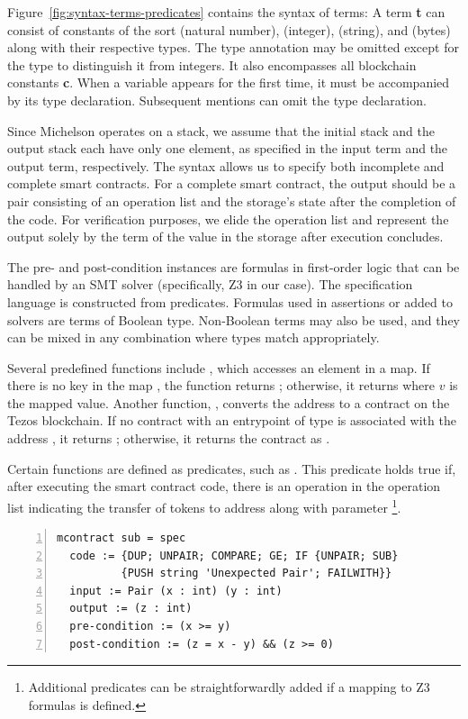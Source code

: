\documentclass[runningheads]{llncs}
\begin{document}
Figure~\ref{fig:syntax-terms-predicates} contains the syntax of terms: A term \textbf{t} can consist of constants of the sort  (natural number),  (integer),  (string), and  (bytes) along with their respective types. The type annotation may be omitted except for the type  to distinguish it from integers. It also encompasses all blockchain constants \textbf{c}. When a variable appears for the first time, it must be accompanied by its type declaration. Subsequent mentions can omit the type declaration.

Since Michelson operates on a stack, we assume that the initial stack and the output stack each have only one element, as specified in the input term and the output term, respectively. The syntax allows us to specify both incomplete and complete smart contracts. For a complete smart contract, the output should be a pair consisting of an operation list and the storage's state after the completion of the code. For verification purposes, we elide the operation list and represent the output solely by the term of the value in the storage after execution concludes. %

The pre- and post-condition instances are formulas in first-order logic that can be handled by an SMT solver (specifically, Z3 in our case). The specification language is constructed from predicates. Formulas used in assertions or added to solvers are terms of Boolean type. Non-Boolean terms may also be used, and they can be mixed in any combination where types match appropriately.

Several predefined functions include , which accesses an element in a map. If there is no key  in the map , the function returns ; otherwise, it returns  where $v$ is the mapped value. Another function, , converts the address  to a contract on the Tezos blockchain. If no contract with an entrypoint of type  is associated with the address , it returns ; otherwise, it returns the contract as .

Certain functions are defined as predicates, such as . This predicate holds true if, after executing the smart contract code, there is an operation in the operation list indicating the transfer of  tokens to address  along with parameter \footnote{Additional predicates can be straightforwardly added if a mapping to Z3 formulas is defined.}.
\begin{lstlisting}[float,captionpos=b,caption={Specification of  the \lstinline/sub/ contract},label={lst:sub-contract-specification},numbers=left]
mcontract sub = spec
  code := {DUP; UNPAIR; COMPARE; GE; IF {UNPAIR; SUB} 
          {PUSH string 'Unexpected Pair'; FAILWITH}}
  input := Pair (x : int) (y : int)
  output := (z : int)
  pre-condition := (x >= y)
  post-condition := (z = x - y) && (z >= 0)
\end{lstlisting}
\end{document}
